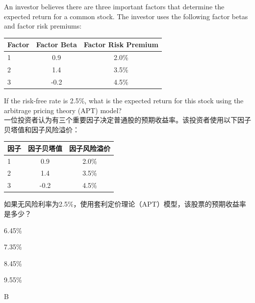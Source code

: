 \documentclass{article}
\newcounter{question} %
\begin{document}
\begin{question}
    An investor believes there are three important factors that determine the expected return for a common stock. The investor uses the following factor betas and factor risk premiums:

    \begin{table}[H]
        \centering
        \begin{tabular}{|l|c|c|}
            \hline
            Factor & Factor Beta & Factor Risk Premium \\
            \hline
            1 & 0.9 & 2.0\% \\
            2 & 1.4 & 3.5\% \\
            3 & -0.2 & 4.5\% \\
            \hline
        \end{tabular}
    \end{table}

    If the risk-free rate is 2.5\%, what is the expected return for this stock using the arbitrage pricing theory (APT) model?
    \\    一位投资者认为有三个重要因子决定普通股的预期收益率。该投资者使用以下因子贝塔值和因子风险溢价：

    \begin{table}[H]
        \centering
        \begin{tabular}{|l|c|c|}
            \hline
            因子 & 因子贝塔值 & 因子风险溢价 \\
            \hline
            1 & 0.9 & 2.0\% \\
            2 & 1.4 & 3.5\% \\
            3 & -0.2 & 4.5\% \\
            \hline
        \end{tabular}
    \end{table}

    如果无风险利率为2.5\%，使用套利定价理论（APT）模型，该股票的预期收益率是多少？
\end{question}

\begin{choices}
    \item 6.45\%
    \item 7.35\%
    \item 8.45\%
    \item 9.55\%
\end{choices}

\begin{correctanswer}
    B
\end{correctanswer}
\end{document}
